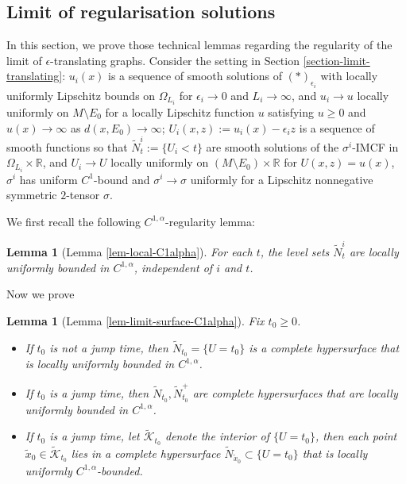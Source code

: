 \documentclass[11pt, letterpaper]{amsart}
\newtheorem{lem}[thm]{Lemma}
\theoremstyle{definition}
\theoremstyle{remark}
\begin{document}
\begin{appendix}
\subsection{Limit of regularisation solutions}\label{appen-limit-regularized}
In this section, we prove those technical lemmas regarding the regularity of the limit of $\epsilon $-translating graphs. Consider the setting in Section \ref{section-limit-translating}: $u_i(x)$ is a sequence of smooth solutions of \hyperref[epsilon-eq]{$(*)_{\epsilon_i}$} with locally uniformly Lipschitz bounds on $\Omega _{L_i}$ for $\epsilon _i\to 0$ and $L_i\to \infty$, and $u_i \to u$ locally uniformly on $M \setminus E_0$ for a locally Lipschitz function $u$ satisfying $u \geq 0$ and $u(x) \to \infty$ as $d(x, E_0) \to \infty$;   $U_i(x,z) := u_i(x) - \epsilon _i z$ is a sequence of smooth functions so that  $\tilde{N}^{i}_t:= \{U_i < t\} $ are smooth solutions of the $\sigma ^{i} $-IMCF in $\Omega _{L_i} \times \mathbb{R}$, and $U_i \to U$ locally uniformly on $(M\setminus E_0) \times \mathbb{R}$ for $U(x,z) = u(x)$, $\sigma ^{i}$ has uniform $C^{1}$-bound and $\sigma ^{i} \to \sigma $ uniformly for a Lipschitz nonnegative symmetric $2$-tensor $\sigma $.

We first recall the following $C^{1,\alpha }$-regularity lemma:
\begin{lem}[Lemma \ref{lem-local-C1alpha}]
For each $t$, the level sets $\tilde{N}^{i}_{t}$ are locally uniformly bounded in $C^{1,\alpha }$, independent of $i$ and $t$.	
\end{lem}

Now we prove
\begin{lem}[Lemma \ref{lem-limit-surface-C1alpha}]
Fix $t_0\geq 0$. 
	\begin{itemize}
		\item[(1)] If $t_0$ is not a jump time, then $\tilde{N}_{t_0} = \{U =t_0\} $ is a complete hypersurface that is locally uniformly bounded in $C^{1,\alpha }$. 
		\item[(2)] If $t_0$ is a jump time, then $\tilde{N}_{t_0}, \tilde{N}^{+}_{t_0}$ are complete hypersurfaces that are locally uniformly bounded in $C^{1,\alpha }$. 
		\item[(3)] If $t_0$ is a jump time, let $\tilde{\mathcal{K}}_{t_0}$ denote the interior of $\{U= t_0\} $, then each point $\tilde{x}_0 \in \tilde{\mathcal{K}}_{t_0}$ lies in a complete hypersurface $\tilde{N}_{\tilde{x}_0} \subset \{ U=t_0\} $ that is locally uniformly $C^{1,\alpha }$-bounded.
	\end{itemize}


\end{lem}
\end{appendix}
\end{document}
